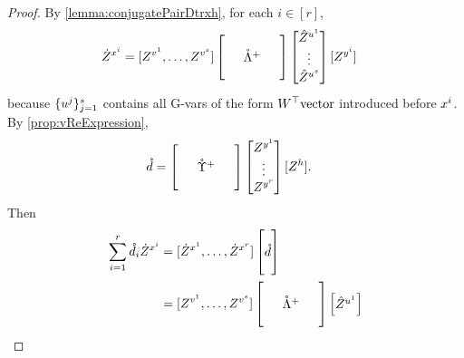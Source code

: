 \documentclass[main.tex]{subfiles}
\begin{document}
\begin{proof}
By \cref{lemma:conjugatePairDtrxh}, for each $i \in [r]$,
\begin{align*}
\Zdot^{\xme^i}
  &=  
    [Z^{\vme^1},
    \ldots,
     Z^{\vme^s}]
    \begin{bmatrix}
    \phz
      &\phz
        &\phz\\
    \phz
      &\mathring{\Lambdame }^+
        &\phz\\
    \phz
      &\phz
        &\phz
    \end{bmatrix}
    \begin{bmatrix}
    \Zhat^{\ume^1}\\
    \vdots\\
    \Zhat^{\ume^s}
    \end{bmatrix}
     [Z^{\yme^i}]
\end{align*}
because $\{u^j\}_{j=1}^s$ contains all G-vars of the form $W^\top\mathrm{vector}$ introduced before $x^i$.
By \cref{prop:vReExpression},
\begin{align*}
\mathring{\dme}
  &=
    \begin{bmatrix}
    \phz
      &\phz
        &\phz\\
    \phz
      &\mathring{\Upsilonme }^+
        &\phz\\
    \phz
      &\phz
        &\phz
    \end{bmatrix}
    \begin{bmatrix}
       Z^{\yme^1}\\
      \vdots\\
       Z^{\yme^r}
    \end{bmatrix}
       [Z^{h}]
      .
\end{align*}
Then
\begin{align*}
\sum_{i=1}^r \mathring{\dme}_i \Zdot^{\xme^i}
&=
  [\Zdot^{\xme^1}, \ldots, \Zdot^{\xme^r}]
  \begin{bmatrix}
    \phz\\
    \mathring{\dme}\\
    \phz
  \end{bmatrix}
  \\
&=
  [Z^{\vme^1},
  \ldots,
   Z^{\vme^s}]
  \begin{bmatrix}
  \phz
    &\phz
      &\phz\\
  \phz
    &\mathring{\Lambdame }^+
      &\phz\\
  \phz
    &\phz
      &\phz
  \end{bmatrix}
  \begin{bmatrix}
  \Zhat^{\ume^1}\\

\end{bmatrix}
\end{align*}
\end{proof}
\end{document}
